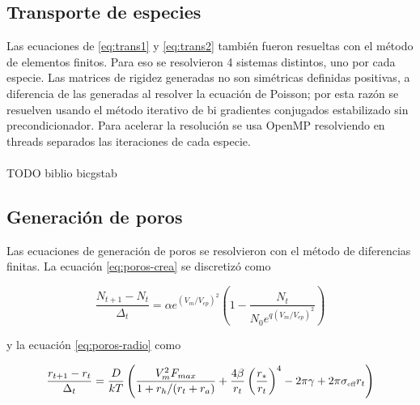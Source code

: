 \documentclass[a4paper,10pt]{article}
\begin{document}
\subsection{Transporte de especies}

Las ecuaciones de \ref{eq:trans1} y \ref{eq:trans2} también fueron resueltas con el método de elementos finitos. Para eso se resolvieron 4 sistemas distintos, uno por cada especie. Las matrices de rigidez generadas no son simétricas definidas positivas, a diferencia de las generadas al resolver la ecuación de Poisson; por esta razón se resuelven usando el método iterativo de bi gradientes conjugados estabilizado sin precondicionador. Para acelerar la resolución se usa OpenMP resolviendo en threads separados las iteraciones de cada especie.\\
\\TODO biblio bicgstab

\subsection{Generación de poros}

Las ecuaciones de generación de poros se resolvieron con el método de diferencias finitas. La ecuación \ref{eq:poros-crea} se discretizó como

\begin{equation} \label{eq:poros-crea-disc}
	\frac{N_{t+1} - N_{t}}{\Delta_t} = \alpha e^{(V_m/V_{ep})^2} \left( 1 - \frac{N_{t}}{N_0 e^{q \left(V_m / V_{ep} \right) ^2}} \right)
\end{equation}

y la ecuación \ref{eq:poros-radio} como

\begin{equation} \label{eq:poros-radio-disc}
	\frac{r_{t+1} - r_t}{\Delta_t} = \frac{D}{kT} \left( \frac{V_m^2 F_{max}}{1+r_h / (r_t+r_a)} + \frac{4 \beta}{r_t} \left(\frac{r_*}{r_t}\right)^4 - 2 \pi \gamma + 2 \pi \sigma_{\textrm{\tiny eff}} r_t \right)
\end{equation}

\end{document}
